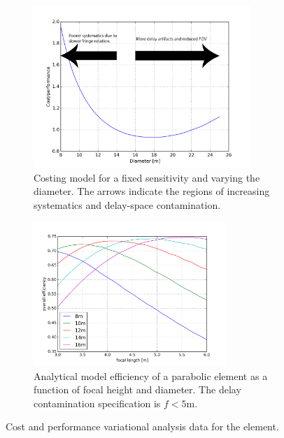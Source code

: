 \documentclass[preprint]{aastex}
\begin{document}
\begin{figure}[h]
	\centering
	\begin{subfigure}[b]{0.46\textwidth}
		\includegraphics[width=0.9\textwidth]{plots/Engineering/nvsd.png}
		\caption{Costing model for a fixed sensitivity and varying the diameter.   The arrows indicate the regions of 
				increasing systematics and delay-space contamination.}
		\label{fig:nvsd} 
	\end{subfigure}
	\quad
	\begin{subfigure}[b]{0.46\textwidth}
		\includegraphics[width=0.8\textwidth]{plots/Engineering/focalEff.png}
		\caption{Analytical model efficiency of a parabolic element as a function of focal height and diameter.   The delay 
				contamination specification is $f<5$m.}
		\label{fig:disheffic}
	\end{subfigure}
	\caption{Cost and performance variational analysis data for the element.}
\end{figure}
\end{document}
